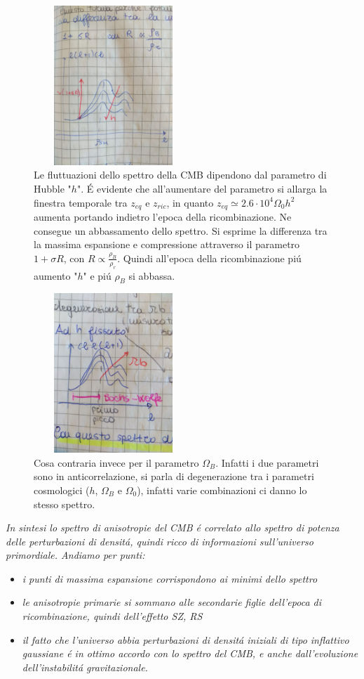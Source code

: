 \documentclass[12pt, a4paper]{article}
\begin{document}
\begin{figure}[htp]
\centering
\includegraphics[width=6cm, height=6cm]{images/flucH.jpeg}
\caption{Le fluttuazioni dello spettro della CMB dipendono dal parametro di Hubble "$h$". \'{E} evidente che all'aumentare del parametro si allarga la finestra temporale tra $z_{eq}$ e $z_{ric}$, in quanto $z_{eq}\simeq 2.6 \cdot 10^{4} \Omega_0 h^2$ aumenta portando indietro l'epoca della ricombinazione. Ne consegue un abbassamento dello spettro. Si esprime la differenza tra la massima espansione e compressione attraverso il parametro $1+\sigma R$, con $R\propto \frac{\rho_B}{\rho_r}$. Quindi all'epoca della ricombinazione pi\'{u} aumento "$h$" e pi\'{u} $\rho_B$ si abbassa.}
\label{fig:flucH}
\end{figure}
\begin{figure}[htp]
\centering
\includegraphics[width=6cm, height=6cm]{images/flucB.jpeg}
\caption{Cosa contraria invece per il parametro $\Omega_B$. Infatti i due parametri sono in anticorrelazione, si parla di degenerazione tra i parametri cosmologici ($h$, $\Omega_B$ e $\Omega_0$), infatti varie combinazioni ci danno lo stesso spettro.}
\label{fig:flucB}
\end{figure}
\textit{In sintesi lo spettro di anisotropie del CMB \'{e} correlato allo spettro di potenza delle perturbazioni di densit\'{a}, quindi ricco di informazioni sull'universo primordiale. Andiamo per punti:}
\begin{itemize}
\item \textit{i punti di massima espansione corrispondono ai minimi dello spettro}
\item \textit{le anisotropie primarie si sommano alle secondarie figlie dell'epoca di ricombinazione, quindi dell'effetto SZ, RS}
\item \textit{il fatto che l'universo abbia perturbazioni di densit\'{a} iniziali di tipo inflattivo gaussiane \'{e } in ottimo accordo con lo spettro del CMB, e anche dall'evoluzione dell'instabilit\'{a} gravitazionale.}
\end{itemize}
\end{document}
